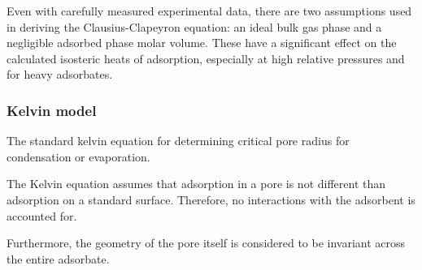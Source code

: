Even with carefully measured experimental data, there are two assumptions used in deriving
the Clausius-Clapeyron equation: an ideal bulk gas phase and a negligible adsorbed phase
molar volume. These have a significant effect on the calculated isosteric heats of adsorption,
especially at high relative pressures and for heavy adsorbates.

\subsubsection{Kelvin model}

The standard kelvin equation for determining critical pore radius for condensation or
evaporation.

The Kelvin equation assumes that adsorption in a pore is not different than adsorption
on a standard surface. Therefore, no interactions with the adsorbent is accounted for.

Furthermore, the geometry of the pore itself is considered to be invariant across the
entire adsorbate.